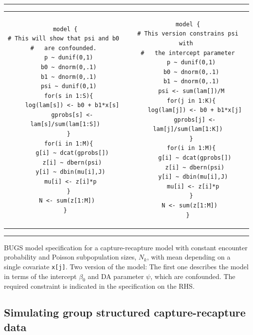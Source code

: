 \begin{panel}[htp]   
\renewcommand{\baselinestretch}{1.0}
\centering
\rule[0.15in]{\textwidth}{.03in}
\begin{tabular}{cc}
\begin{minipage}{2.75in}
{\small
\begin{verbatim}
model {
# This will show that psi and b0 
#   are confounded. 
  p ~ dunif(0,1)
  b0 ~ dnorm(0,.1)
  b1 ~ dnorm(0,.1)
  psi ~ dunif(0,1)
  for(s in 1:S){
    log(lam[s]) <- b0 + b1*x[s]
    gprobs[s] <- lam[s]/sum(lam[1:S])
  }
  for(i in 1:M){
    g[i] ~ dcat(gprobs[])
    z[i] ~ dbern(psi)
   y[i] ~ dbin(mu[i],J)
   mu[i] <- z[i]*p
  }
  N <- sum(z[1:M]) 
}
\end{verbatim}
}
\end{minipage}
&
\begin{minipage}{2.75in}
{\small
\begin{verbatim}
model {
# This version constrains psi with 
#   the intercept parameter
  p ~ dunif(0,1)
  b0 ~ dnorm(0,.1)
  b1 ~ dnorm(0,.1)
  psi <- sum(lam[])/M
  for(j in 1:K){
    log(lam[j]) <- b0 + b1*x[j]
    gprobs[j] <- lam[j]/sum(lam[1:K])
  }
  for(i in 1:M){
    g[i] ~ dcat(gprobs[])
    z[i] ~ dbern(psi)
   y[i] ~ dbin(mu[i],J)
   mu[i] <- z[i]*p
  }
  N <- sum(z[1:M]) 
}
\end{verbatim}
}
\end{minipage}
\end{tabular}
\rule[-0.15in]{\textwidth}{.03in}
\caption{BUGS model specification for a capture-recapture model with
  constant encounter probability and Poisson subpopulation sizes,
  $N_{k}$, with mean depending on a single covariate \mbox{\tt x[j]}. 
Two version of the model: The first one describes the model in terms
of the intercept $\beta_0$ and DA parameter $\psi$, which are
confounded. The required constraint is indicated in the specification
on the RHS. 
}
\label{panel.wbcode}
\end{panel}

\subsection{
Simulating group structured 
capture-recapture data
}

